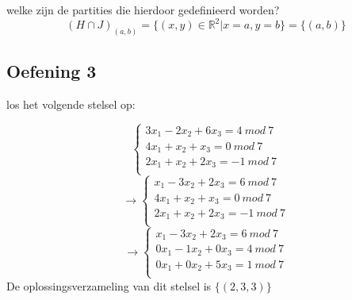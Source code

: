 \documentclass[main.tex]{subfiles}
\begin{document}
welke zijn de partities die hierdoor gedefinieerd worden?
\[
(H \cap J)_{(a,b)} =\{(x,y) \in \mathbb{R}^2| x=a,y=b\}=\{(a,b)\}
\]

\subsection*{Oefening 3}
los het volgende stelsel op:

\[
\left\{
\begin{array}{c}
  3x_1-2x_2+6x_3=4\ mod\ 7\\
  4x_1+x_2+x_3=0\ mod\ 7\\
  2x_1+x_2+2x_3=-1\ mod\ 7\\
\end{array}
\right.
\]
\[
\longrightarrow
\left\{
\begin{array}{c}
  x_1-3x_2+2x_3=6\ mod\ 7\\
  4x_1+x_2+x_3=0\ mod\ 7\\
  2x_1+x_2+2x_3=-1\ mod\ 7\\
\end{array}
\right.
\]
\[
\longrightarrow
\left\{
\begin{array}{c}
  x_1-3x_2+2x_3=6\ mod\ 7\\
  0x_1-1x_2+0x_3=4\ mod\ 7\\
  0x_1+0x_2+5x_3=1\ mod\ 7\\
\end{array}
\right.
\]
De oplossingsverzameling van dit stelsel is $\{(2,3,3)\}$
\end{document}
